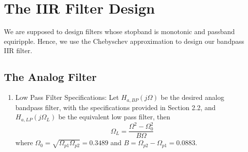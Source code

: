 \documentclass{article}
\begin{document}
	
	\section{The IIR Filter Design}
	We are supposed to design filters whose stopband is monotonic and passband equiripple.  
	Hence, we use the Chebyschev approximation to design our bandpass IIR filter.
	\subsection{The Analog Filter}
	\begin{enumerate}
		
		\item {Low Pass Filter Specifications:}  Let $H_{a, BP}(j\Omega)$ be the desired analog bandpass filter,  with the specifications provided in Section 2.2, and $H_{a,LP}(j\Omega_L)$ be the equivalent low pass filter, then
		\begin{equation}
			\Omega_L = \frac{\Omega^2 - \Omega_0^2}{B\Omega} \label{eq:freq_transform}
		\end{equation}
		where $\Omega_0 = \sqrt{\Omega_{p1}\Omega_{p2}} = 0.3489$ and $B = \Omega_{p2} - \Omega_{p1} = 0.0883$.
		

\end{enumerate}
\end{document}
